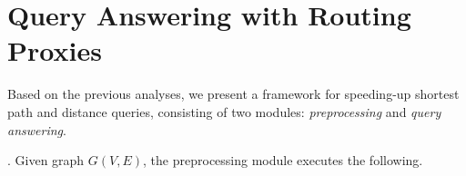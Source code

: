 \section{Query Answering with Routing Proxies}
\label{sec-query}



 Based on the previous analyses, we present a framework for speeding-up shortest  path and distance queries, consisting of two modules: {\em preprocessing} and {\em query answering}.

. Given graph $G(V, E)$, the preprocessing module executes the following.

